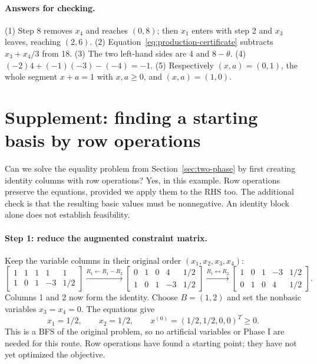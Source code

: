 \documentclass[11pt,a4paper]{article}
\begin{document}
\paragraph{Answers for checking.}
(1) Step 8 removes $x_4$ and reaches $(0,8)$;
then $x_1$ enters with step 2 and $x_3$ leaves, reaching $(2,6)$.
(2) Equation~\eqref{eq:production-certificate} subtracts $x_3+x_4/3$ from 18.
(3) The two left-hand sides are $4$ and $8-\theta$.
(4) $(-2)4+(-1)(-3)-(-4)=-1$.
(5) Respectively $(x,a)=(0,1)$, the whole segment $x+a=1$ with $x,a\geq0$,
and $(x,a)=(1,0)$.

\clearpage
\section{Supplement: finding a starting basis by row operations}\label{sec:row-operation-start}
Can we solve the equality problem from Section~\ref{sec:two-phase} by first
creating identity columns with row operations? Yes, in this example. Row
operations preserve the equations, provided we apply them to the RHS too.
The additional check is that the resulting basic values must be nonnegative.
An identity block alone does not establish feasibility.

\paragraph{Step 1: reduce the augmented constraint matrix.}
Keep the variable columns in their original order $(x_1,x_2,x_3,x_4)$:
\[
  \left[\begin{array}{rrrr|r}
      1&1&1&1&1\\
      1&0&1&-3&1/2
    \end{array}\right]
  \xrightarrow{R_1\leftarrow R_1-R_2}
  \left[\begin{array}{rrrr|r}
      0&1&0&4&1/2\\
      1&0&1&-3&1/2
    \end{array}\right]
  \xrightarrow{R_1\leftrightarrow R_2}
  \left[\begin{array}{rrrr|r}
      1&0&1&-3&1/2\\
      0&1&0&4&1/2
    \end{array}\right].
\]
Columns 1 and 2 now form the identity. Choose $B=(1,2)$ and set the
nonbasic variables $x_3=x_4=0$. The equations give
\[
  x_1=1/2,\qquad x_2=1/2,
  \qquad x^{(0)}=(1/2,1/2,0,0)^T\geq0.
\]
This is a BFS of the original problem, so no artificial variables or Phase I
are needed for this route. Row operations have found a starting point; they
have not yet optimized the objective.
\end{document}
